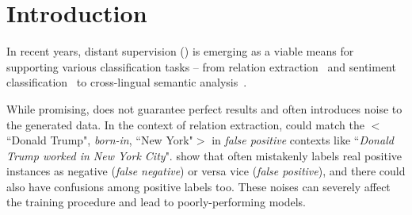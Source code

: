 \section{Introduction}

In recent years, distant supervision (\DS) is emerging as a viable means for supporting various classification tasks -- from relation extraction~\cite{mintz2009distant} and sentiment classification~\cite{go2009twitter} to cross-lingual semantic
analysis~\cite{fang2016learning}. 



While promising, \DS does not guarantee perfect results and often introduces noise to the
generated data. In the context of relation extraction, \DS could match the  $<$``Donald Trump",
\emph{born-in}, ``New York"$>$  in \emph{false positive} contexts like ``\emph{Donald Trump worked in New York City}".
 show that \DS often mistakenly labels real positive instances as negative (\emph{false negative}) or
versa vice (\emph{false positive}), and there could also have confusions among positive labels too. These noises can
severely affect the training
procedure and lead to poorly-performing models.

